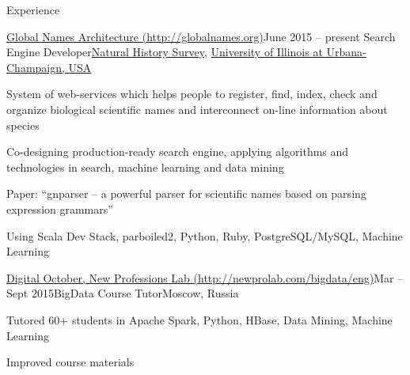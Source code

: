\documentclass{resume} %
\begin{document}

\begin{rSection}{Experience}

\begin{samepage}
\begin{rSubsection}{\href{http://globalnames.org/}{Global Names Architecture 
(http://globalnames.org)}}{June 2015 -- present}
{Search Engine Developer}{\href{http://www.inhs.illinois.edu/}{Natural History Survey},
\href{http://illinois.edu/}{University of Illinois at Urbana-Champaign, USA}}
\item System of web-services which helps people to register, find, index, check and organize
biological scientific names and interconnect on-line information about species
\item Co-designing production-ready search engine, applying algorithms and technologies in search,
machine learning and data mining
\item Paper: ``gnparser -- a powerful parser for scientific names based on parsing expression
grammars''
\item Using Scala Dev Stack, parboiled2, Python, Ruby, PostgreSQL/MySQL, Machine Learning
\end{rSubsection}
\end{samepage}

\pagebreak

\begin{samepage}
\begin{rSubsection}{\href{http://newprolab.com/bigdata/eng/}{Digital October, New Professions Lab 
(http://newprolab.com/bigdata/eng)}}{Mar -- Sept 2015}{BigData Course Tutor}{Moscow, 
Russia}
\item Tutored 60+ students in Apache Spark, Python, HBase, Data Mining, Machine Learning
\item Improved course materials
\end{rSubsection}
\end{samepage}



\end{rSection}
\end{document}
